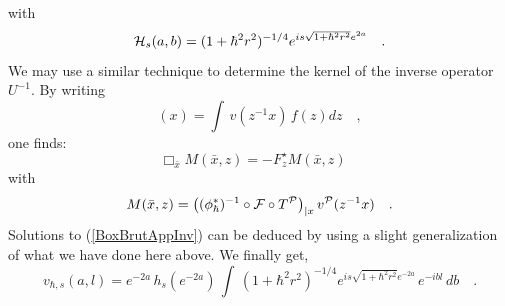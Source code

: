 \documentclass{article}
\begin{document}
with
\begin{equation}\label{uGenbis}
{\cal H}_s(a,b) = (1+ \hbar^2r^2)^{-1/4} e^{  i s
\sqrt{1+\hbar^2r^2} e^{2a}} \quad.
\end{equation}
We may use a similar technique to determine the kernel of the inverse operator $U^{-1}$. By writing
\begin{equation}
 [U^{-1}f]({x})=\int \, v({z}^{-1}{x}) \, f({z}) d{z} \quad,
 \end{equation}
one finds:
\begin{equation}\label{BoxBrutAppInv}
 \Box_{\bar{{x}}} M(\bar{{x}},{z}) = - F^\star_{{z}} M(\bar{{x}},{z}) \quad
 \end{equation}
with
\begin{equation}\label{M}
M(\bar{{  x}},{z}) = \left( (\phi_\hbar^*)^{-1} \circ {\cal F}
\circ T^{{\cal P}} \right)_{|{ x}} v^{{\cal P}}({z}^{-1}{x}) \quad .
\end{equation}
Solutions to (\ref{BoxBrutAppInv}) can be deduced by using a slight generalization of what we have done here above. We finally get,
\begin{equation}\label{vGen2}
v_{\hbar,s}(a,l) = e^{-2a} \, h_s(  e^{-2a})\, \int
\, (1+ \hbar^2r^2)^{-1/4} e^{  i s \sqrt{1+\hbar^2r^2} e^{-2a}} \, e^{-i b l} \, db \quad.
\end{equation}
\end{document}
